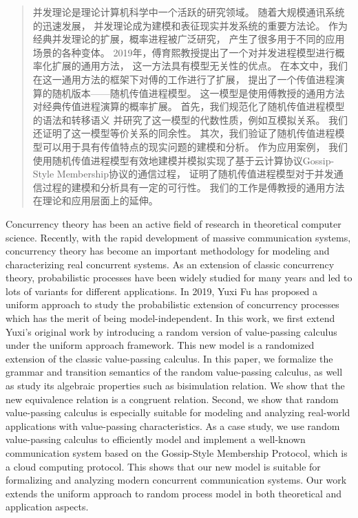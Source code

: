 
\begin{abstract}
  并发理论是理论计算机科学中一个活跃的研究领域。
  随着大规模通讯系统的迅速发展，
  并发理论成为建模和表征现实并发系统的重要方法论。
  作为经典并发理论的扩展，概率进程被广泛研究，
  产生了很多用于不同的应用场景的各种变体。
  2019年，傅育熙教授提出了一个对并发进程模型进行概率化扩展的通用方法，
  这一方法具有模型无关性的优点。
  在本文中，我们在这一通用方法的框架下对傅的工作进行了扩展，
  提出了一个传值进程演算的随机版本——随机传值进程模型。
  这一模型是使用傅教授的通用方法对经典传值进程演算的概率扩展。
  首先，我们规范化了随机传值进程模型的语法和转移语义
  并研究了这一模型的代数性质，例如互模拟关系。
  我们还证明了这一模型等价关系的同余性。
  其次，我们验证了随机传值进程模型可以用于具有传值特点的现实问题的建模和分析。
  作为应用案例，
  我们使用随机传值进程模型有效地建模并模拟实现了基于云计算协议Gossip-Style Membership协议的通信过程，
  证明了随机传值进程模型对于并发通信过程的建模和分析具有一定的可行性。
  我们的工作是傅教授的通用方法在理论和应用层面上的延伸。
\end{abstract}

\begin{abstract*}
  Concurrency theory has been an active field of research in theoretical computer science.
   Recently, with the rapid development of massive communication systems, 
   concurrency theory has become an important methodology for modeling and characterizing real concurrent systems. 
   As an extension of classic concurrency theory, probabilistic processes have been widely studied for many years and led to lots of variants for different applications. 
   In 2019, Yuxi Fu has proposed a uniform approach to study the probabilistic extension of concurrency processes 
   which has the merit of being model-independent. 
   In this work, we first extend Yuxi's original work by introducing a random version of value-passing calculus under the uniform approach framework.
  This new model is a randomized extension of the classic value-passing calculus.
   In this paper, we formalize the grammar and transition semantics of the random value-passing calculus, 
   as well as study its algebraic properties such as bisimulation relation. 
   We show that the new equivalence relation is a congruent relation. 
   Second, we show that random value-passing calculus is especially suitable for modeling and analyzing real-world applications with value-passing characteristics. 
   As a case study, we use random value-passing calculus to efficiently model and implement a well-known communication system based on the Gossip-Style Membership Protocol, which is a cloud computing protocol. 
   This shows that our new model is suitable for formalizing and analyzing modern concurrent communication systems.
    Our work extends the uniform approach to random process model in both theoretical and application aspects.
\end{abstract*}
